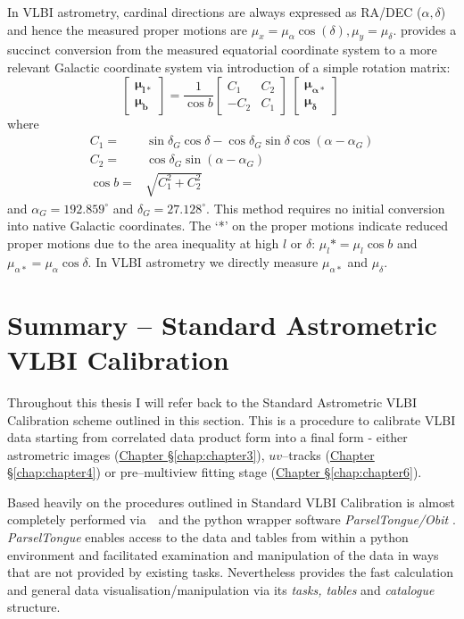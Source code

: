 		In VLBI astrometry, cardinal directions are always expressed as RA/DEC ($\alpha,\delta$) and hence the measured proper motions are $\mu_x=\mu_\alpha\cos(\delta), \mu_y=\mu_\delta$. \citet{Poleski2013} provides a succinct conversion from the measured equatorial coordinate system to a more relevant Galactic coordinate system via introduction of a simple rotation matrix:
		\[\begin{bmatrix}
		\boldsymbol{\mu_{l*}} \\
		\boldsymbol{\mu_b}
		\end{bmatrix}
		=  \frac{1}{\cos b}
		\begin{bmatrix}
		C_1 & C_2\\
		-C_2 &C_1
		\end{bmatrix}
		\
		\begin{bmatrix}
		\boldsymbol{\mu_{\alpha*}} \\
		\boldsymbol{\mu_\delta}
		\end{bmatrix}
		\ 	    
		\]
		where
		\begin{align*}
		C_1 =&\sin\delta_G\cos\delta - \cos\delta_G\sin\delta\cos(\alpha-\alpha_G) \\
		C_2 =&\cos\delta_G\sin(\alpha-\alpha_G) \\
		\cos b =& \sqrt{C_1^2 + C_2^2}
		\end{align*} and $\alpha_G=192.859^\circ$ and $\delta_G=27.128^\circ$. This method requires no initial conversion into native Galactic coordinates. The `*' on the proper motions indicate reduced proper motions due to the area inequality at high $l$ or $\delta$: $\mu_l* = \mu_l\cos b$ and $\mu_{\alpha*} = \mu_\alpha\cos\delta$. In VLBI astrometry we directly measure $\mu_{\alpha*}$ and $\mu_\delta$.


\section{Summary -- Standard Astrometric VLBI Calibration} \label{sec:standardvlbicalibration}
	Throughout this thesis I will refer back to the Standard Astrometric VLBI Calibration scheme outlined in this section. This is a procedure to calibrate VLBI data starting from correlated data product form into a final form - either astrometric images (\hyperref[chap:chapter3]{Chapter \S\ref*{chap:chapter3}}), $uv$--tracks (\hyperref[chap:chapter4]{Chapter \S\ref*{chap:chapter4}}) or pre--multiview fitting stage (\hyperref[chap:chapter6]{Chapter \S\ref*{chap:chapter6}}).
		
	Based heavily on the procedures outlined in \citet{Brunthaler2011,Reid2009a,Reid2009f} Standard VLBI Calibration is almost completely performed via \aips\,\,\citep[Astronomical Image Processing Software; ][]{Greisen1990} and the python wrapper software {\it ParselTongue/Obit} \citep{Kettenis2006}. {\it ParselTongue} enables access to the \aips\space data and tables from within a python environment and facilitated examination and manipulation of the data in ways that are not provided by existing \aips\space tasks. Nevertheless \aips provides the fast calculation and general data visualisation/manipulation via its {\it tasks, tables} and {\it catalogue} structure. 
	
